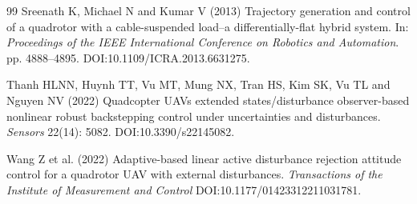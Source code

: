 \documentclass[Review,sageh,times]{sagej}
\begin{document}
\begin{thebibliography}{99}
Sreenath K, Michael N and Kumar V (2013) Trajectory generation and control of a quadrotor
with a cable-suspended load--a differentially-flat hybrid system.
In: \emph{Proceedings of the
IEEE International Conference on Robotics and Automation}. pp. 4888--4895.
DOI:10.1109/ICRA.2013.6631275.

Thanh HLNN, Huynh TT, Vu MT, Mung NX, Tran HS, Kim SK, Vu TL and Nguyen NV (2022)
Quadcopter UAVs extended states/disturbance observer-based nonlinear robust backstepping
control under uncertainties and disturbances. \emph{Sensors} 22(14): 5082. DOI:10.3390/s22145082.

Wang Z et al. (2022) Adaptive-based linear active disturbance rejection attitude control for a
quadrotor UAV with external disturbances. \emph{Transactions of the Institute of Measurement and
Control} DOI:10.1177/01423312211031781.

\end{thebibliography}
\end{document}
